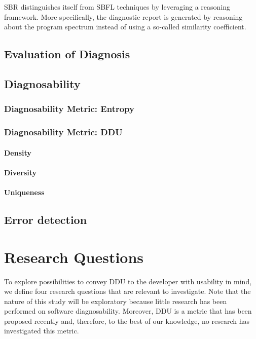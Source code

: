 \documentclass[twoside,a4paper,11pt]{memoir}
\begin{document}
SBR distinguishes itself from SBFL techniques by leveraging a reasoning framework.
More specifically, the diagnostic report is generated by reasoning about the program spectrum instead of using a so-called similarity coefficient.

\section{Evaluation of Diagnosis}

\section{Diagnosability}

\subsection{Diagnosability Metric: Entropy}
\subsection{Diagnosability Metric: DDU}

\subsubsection{Density}

\subsubsection{Diversity}

\subsubsection{Uniqueness}

\section{Error detection}


\chapter{Research Questions}
\label{ch:research_questions}
To explore possibilities to convey DDU to the developer with usability in mind, we define four research questions that are relevant to investigate.
Note that the nature of this study will be exploratory because little research has been performed on software diagnosability.
Moreover, DDU is a metric that has been proposed recently \cite{DBLP:conf/icse/PerezAD17} and, therefore, to the best of our knowledge, no research has investigated this metric.
\end{document}
